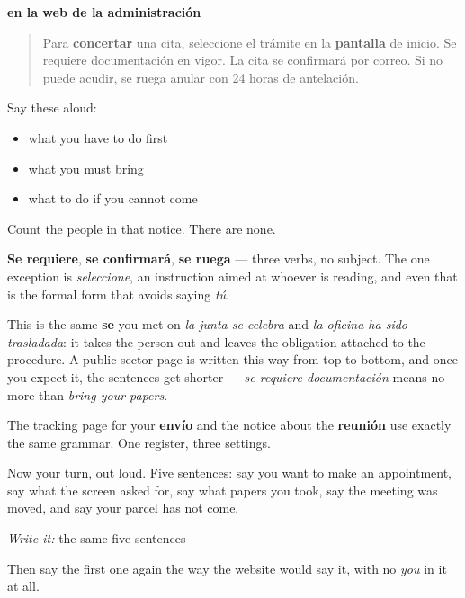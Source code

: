 \textbf{en la web de la administración}

\begin{quote}
Para \textbf{concertar} una cita, seleccione el trámite en la \textbf{pantalla} de inicio. Se requiere documentación en vigor. La cita se confirmará por correo. Si no puede acudir, se ruega anular con 24 horas de antelación.
\end{quote}

Say these aloud:

\begin{itemize}
\raggedright
  \item what you have to do first
  \item what you must bring
  \item what to do if you cannot come
\end{itemize}

\begin{culture}
Count the people in that notice. There are none.

\textbf{Se requiere}, \textbf{se confirmará}, \textbf{se ruega} — three verbs, no subject. The one exception is \emph{seleccione}, an instruction aimed at whoever is reading, and even that is the formal form that avoids saying \emph{tú}.

This is the same \textbf{se} you met on \emph{la junta se celebra} and \emph{la oficina ha sido trasladada}: it takes the person out and leaves the obligation attached to the procedure. A public-sector page is written this way from top to bottom, and once you expect it, the sentences get shorter — \emph{se requiere documentación} means no more than \emph{bring your papers}.

The tracking page for your \textbf{envío} and the notice about the \textbf{reunión} use exactly the same grammar. One register, three settings.
\end{culture}

\begin{tcolorbox}[breakable,colback=teal!4,colframe=teal!35!black,title={Before you move on}]
Now your turn, out loud. Five sentences: say you want to make an appointment, say what the screen asked for, say what papers you took, say the meeting was moved, and say your parcel has not come.

\emph{Write it:} the same five sentences

Then say the first one again the way the website would say it, with no \emph{you} in it at all.
\end{tcolorbox}
